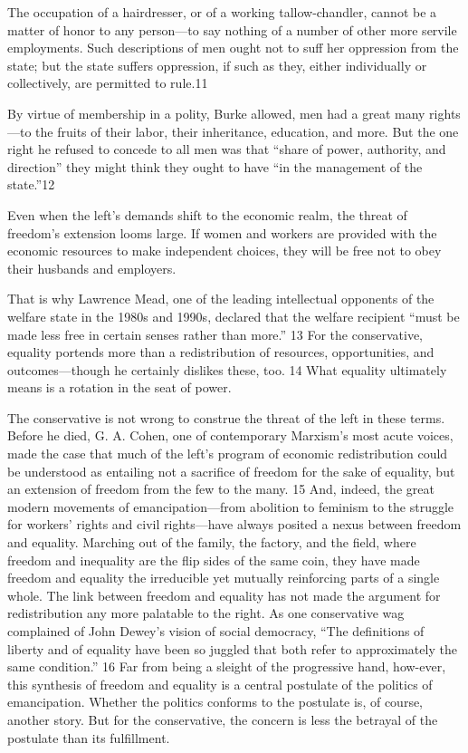  \par 
The occupation of a hairdresser, or of a working tallow-chandler, cannot be a matter of honor to any person—to say nothing of a number of other more servile employments. Such descriptions of men ought not to suff her oppression from the state; but the state suffers oppression, if such as they, either individually or collectively, are permitted to rule.{\color{blue}11}
 \par 
By virtue of membership in a polity, Burke allowed, men had a great many rights—to the fruits of their labor, their inheritance, education, and more. But the one right he refused to concede to all men was that “share of power, authority, and direction” they might think they ought to have “in the management of the state.”{\color{blue}12}
 \par 
Even when the left’s demands shift to the economic realm, the threat of freedom’s extension looms large. If women and workers are provided with the economic resources to make independent choices, they will be free not to obey their husbands and employers.
 \par 
That is why Lawrence Mead, one of the leading intellectual opponents of the welfare state in the 1980s and 1990s, declared that the welfare recipient “must be made less free in certain senses rather than more.” {\color{blue}13} For the conservative, equality portends more than a redistribution of resources, opportunities, and outcomes—though he certainly dislikes these, too. {\color{blue}14} What equality ultimately means is a rotation in the seat of power.
 \par 
The conservative is not wrong to construe the threat of the left in these terms. Before he died, G. A. Cohen, one of contemporary Marxism’s most acute voices, made the case that much of the left’s program of economic redistribution could be understood as entailing not a sacrifice of freedom for the sake of equality, but an extension of freedom from the few to the many. {\color{blue}15} And, indeed, the great modern movements of emancipation—from abolition to feminism to the struggle for workers’ rights and civil rights—have always posited a nexus between freedom and equality. Marching out of the family, the factory, and the field, where freedom and inequality are the flip sides of the same coin, they have made freedom and equality the irreducible yet mutually reinforcing parts of a single whole. The link between freedom and equality has not made the argument for redistribution any more palatable to the right. As one conservative wag complained of John Dewey’s vision of social democracy, “The definitions of liberty and of equality have been so juggled that both refer to approximately the same condition.” {\color{blue}16} Far from being a sleight of the progressive hand, how-ever, this synthesis of freedom and equality is a central postulate of the politics of emancipation. Whether the politics conforms to the postulate is, of course, another story. But for the conservative, the concern is less the betrayal of the postulate than its fulfillment.
